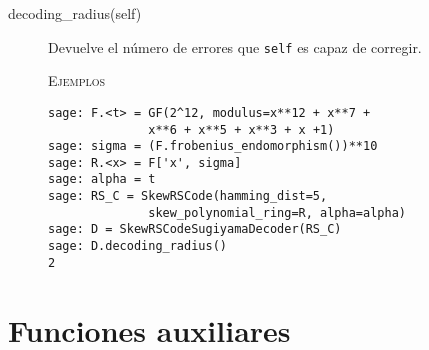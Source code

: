 \begin{description}
\begin{description}
        \item[decoding\_radius(self)]
        Devuelve el número de errores que \texttt{self} es capaz de corregir.

        \textsc{Ejemplos}
        \begin{lstlisting}
sage: F.<t> = GF(2^12, modulus=x**12 + x**7 +
              x**6 + x**5 + x**3 + x +1)
sage: sigma = (F.frobenius_endomorphism())**10
sage: R.<x> = F['x', sigma]
sage: alpha = t
sage: RS_C = SkewRSCode(hamming_dist=5,
              skew_polynomial_ring=R, alpha=alpha)
sage: D = SkewRSCodeSugiyamaDecoder(RS_C)
sage: D.decoding_radius()
2
        \end{lstlisting}
    \end{description}
\end{description}

\section{Funciones auxiliares}

